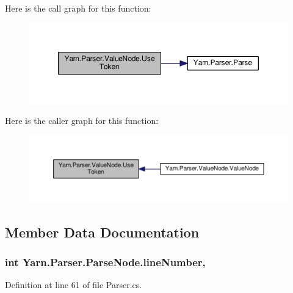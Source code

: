 Here is the call graph for this function\-:
\nopagebreak
\begin{figure}[H]
\begin{center}
\leavevmode
\includegraphics[width=350pt]{a00178_a7be6a979ee21b2d07ce541fb9c5b52df_cgraph}
\end{center}
\end{figure}




Here is the caller graph for this function\-:
\nopagebreak
\begin{figure}[H]
\begin{center}
\leavevmode
\includegraphics[width=350pt]{a00178_a7be6a979ee21b2d07ce541fb9c5b52df_icgraph}
\end{center}
\end{figure}




\subsection{Member Data Documentation}
\hypertarget{a00138_a18b493382de0fde5b4299c1bd2250075}{
\subsubsection[{line\-Number}]{\setlength{\rightskip}{0pt plus 5cm}int Yarn.\-Parser.\-Parse\-Node.\-line\-Number\hspace{0.3cm}{\ttfamily [package]}, {\ttfamily [inherited]}}}\label{a00138_a18b493382de0fde5b4299c1bd2250075}


Definition at line 61 of file Parser.\-cs.



